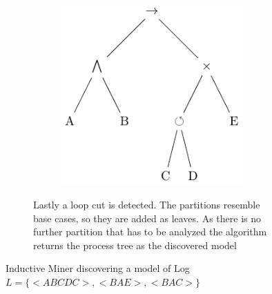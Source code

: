 \documentclass[
	a4paper,
	pagesize,
	pdftex,
	12pt,
	twoside, %
	BCOR=5mm, %
	ngerman,
	fleqn,
	final,
	]{scrartcl}
\begin{document}
\begin{figure}
\begin{subfigure}[t]{\textwidth}
 \begin{subfigure}[t]{0.5\textwidth}
    \centering
    \includegraphics[width=0.5\linewidth]{img/xor_tree_final.pdf}
 \end{subfigure}
     \caption{Lastly a loop cut is detected. The partitions resemble base cases, so they are added as leaves. As there is no further partition that has to be analyzed the algorithm returns the process tree as the discovered model}
\end{subfigure}
\caption{Inductive Miner discovering a model of Log $L=\{<ABCDC>,<BAE>,<BAC>\}$}
\label{fig:IM}
\end{figure}
\end{document}
